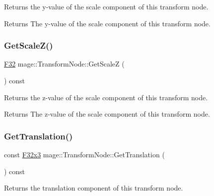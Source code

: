 Returns the y-\/value of the scale component of this transform node.

\begin{DoxyReturn}{Returns}
The y-\/value of the scale component of this transform node. 
\end{DoxyReturn}
\hypertarget{classmage_1_1_transform_node_adcfc199469861d9af4cd8d532645ac99}{}\label{classmage_1_1_transform_node_adcfc199469861d9af4cd8d532645ac99} 
\subsubsection{\texorpdfstring{Get\+Scale\+Z()}{GetScaleZ()}}
{\footnotesize\ttfamily \hyperlink{namespacemage_aa97e833b45f06d60a0a9c4fc22ae02c0}{F32} mage\+::\+Transform\+Node\+::\+Get\+ScaleZ (\begin{DoxyParamCaption}{ }\end{DoxyParamCaption}) const\hspace{0.3cm}{\ttfamily [noexcept]}}

Returns the z-\/value of the scale component of this transform node.

\begin{DoxyReturn}{Returns}
The z-\/value of the scale component of this transform node. 
\end{DoxyReturn}
\hypertarget{classmage_1_1_transform_node_a5964010e43daef3dfba42621abc12e46}{}\label{classmage_1_1_transform_node_a5964010e43daef3dfba42621abc12e46} 
\subsubsection{\texorpdfstring{Get\+Translation()}{GetTranslation()}}
{\footnotesize\ttfamily const \hyperlink{namespacemage_a73fbe0da4b8d5bc156bb8453e5b63a17}{F32x3} mage\+::\+Transform\+Node\+::\+Get\+Translation (\begin{DoxyParamCaption}{ }\end{DoxyParamCaption}) const\hspace{0.3cm}{\ttfamily [noexcept]}}

Returns the translation component of this transform node.


